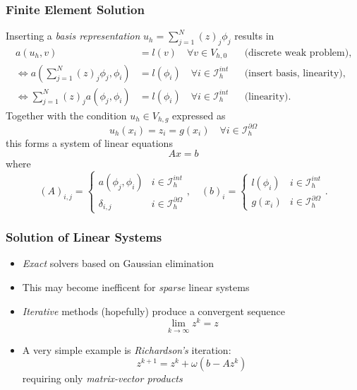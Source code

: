 \documentclass[ignorenonframetext,11pt]{beamer}
\theoremstyle{definition}
\begin{document}
\begin{frame}
\frametitle{Finite Element Solution}
Inserting a {\em basis representation} $u_h = \sum_{j=1}^N (z)_j \phi_j$ results in
\begin{align*}
a(u_h,v) &= l(v) \quad \forall v\in V_{h,0} &&\text{(discrete weak problem)},\nonumber \\
\Leftrightarrow 
a\left(\sum_{j=1}^N (z)_j \phi_j,\phi_i\right) &= l(\phi_i) \quad \forall i\in \mathcal{I}_h^{int} 
&&\text{(insert basis, linearity)}, \nonumber \\
\Leftrightarrow 
\sum_{j=1}^N (z)_j a\left( \phi_j,\phi_i\right) &= l(\phi_i) \quad \forall i\in \mathcal{I}_h^{int} 
&&\text{(linearity)}. \label{eq:linear1}
\end{align*}
Together with the condition $u_h\in V_{h,g}$ expressed as
\begin{equation*}
u_h(x_i) = z_i = g(x_i) \quad\forall i\in\mathcal{I}_h^{\partial\Omega}
\label{eq:linear2}
\end{equation*}
this forms a system of linear equations 
$$Ax=b$$ 
where
\begin{equation*}
(A)_{i,j} = \left\{\begin{array}{ll}
a(\phi_j,\phi_i) & i\in\mathcal{I}_h^{int}\\
\delta_{i,j} & i\in\mathcal{I}_h^{\partial\Omega}
\end{array}\right., \quad
(b)_{i} = \left\{\begin{array}{ll}
l(\phi_i) & i\in\mathcal{I}_h^{int}\\
g(x_i) & i\in\mathcal{I}_h^{\partial\Omega}
\end{array}\right. .
\label{eq:systemdetail}
\end{equation*}
\end{frame}

\begin{frame}
\frametitle{Solution of Linear Systems}
\begin{itemize}
\item {\em Exact} solvers based on Gaussian elimination
\item This may become inefficent for {\em sparse} linear systems
\item {\em Iterative} methods (hopefully) produce a convergent sequence
$$\lim_{k\to\infty} z^k = z$$
\item A very simple example is {\em Richardson's} iteration:
$$ z^{k+1} = z^{k} + \omega (b-Az^{k})$$
requiring only {\em matrix-vector products}
\end{itemize}
\end{frame}
\end{document}

